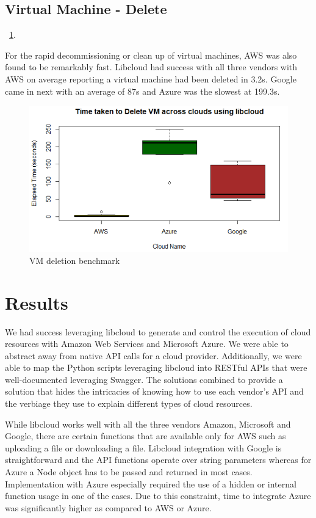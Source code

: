 \subsection{Virtual Machine - Delete}~\ref{F:vm-delete}.

For the rapid decommissioning or clean up of virtual machines, AWS was also
found to be remarkably fast. Libcloud had success with all three vendors with
AWS on average reporting a virtual machine had been deleted in 3.2s. Google
came in next with an average of 87s and Azure was the slowest at 199.3s.

\begin{figure}[!ht]
  \centering
  \includegraphics[width=\columnwidth]{images/DeleteVM.png}
  \caption{VM deletion benchmark}\label{F:vm-delete}
\end{figure}

\section{Results}
We had success leveraging libcloud to generate and control the execution of
cloud resources with Amazon Web Services and Microsoft Azure. We were able to
abstract away from native API calls for a cloud provider. Additionally, we were
able to map the Python scripts leveraging libcloud into RESTful APIs that were
well-documented leveraging Swagger. The solutions combined to provide a
solution that hides the intricacies of knowing how to use each vendor's API and
the verbiage they use to explain different types of cloud resources. 

While libcloud works well with all the three vendors Amazon, Microsoft and
Google,
there are certain functions that are available only for AWS such as uploading
a file or downloading a file. Libcloud integration with Google is
straightforward
and the API functions operate over string parameters whereas for Azure a Node
object has to be passed and returned in most cases. Implementation with Azure
especially required the use of a hidden or internal function usage in one of
the
cases. Due to this constraint, time to integrate Azure was significantly higher
as compared
to AWS or Azure.


